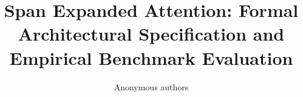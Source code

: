 \title{\textbf{Span Expanded Attention: Formal Architectural Specification and Empirical Benchmark Evaluation}}

\author{Anonymous authors}
